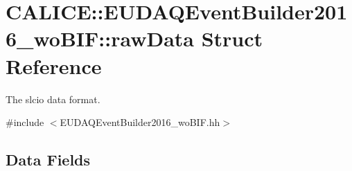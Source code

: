 \section{C\-A\-L\-I\-C\-E\-:\-:E\-U\-D\-A\-Q\-Event\-Builder2016\-\_\-wo\-B\-I\-F\-:\-:raw\-Data Struct Reference}
\label{structCALICE_1_1EUDAQEventBuilder2016__woBIF_1_1rawData}


The slcio data format.  




{\ttfamily \#include $<$E\-U\-D\-A\-Q\-Event\-Builder2016\-\_\-wo\-B\-I\-F.\-hh$>$}

\subsection*{Data Fields}
